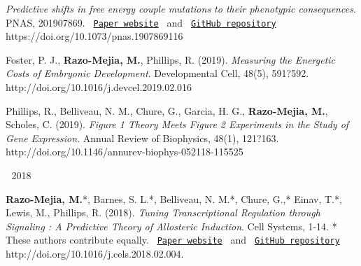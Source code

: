 \begin{cventries}
{\begin{cvitems}
{\begin{flushleft}
          \textit{Predictive shifts in free energy couple mutations to their
          phenotypic consequences}. PNAS, 201907869.
          \texttt{
          \href{https://www.rpgroup.caltech.edu/mwc_mutants/}{Paper website} 
          }
          and
          \texttt{
          \href{https://github.com/RPGroup-PBoC/mwc_mutants}{GitHub repository}
          }
          \linebreak
          https://doi.org/10.1073/pnas.1907869116
        \end{flushleft}
        }
        \item {
          \begin{flushleft}
            Foster, P. J., \textbf{Razo-Mejia, M.}, Phillips, R. (2019).
            \textit{Measuring the Energetic Costs of Embryonic Development}.
            Developmental Cell, 48(5), 591?592.\linebreak
            http://doi.org/10.1016/j.devcel.2019.02.016
          \end{flushleft}
        }
        \item {
          \begin{flushleft}
            Phillips, R., Belliveau, N. M., Chure, G., Garcia, H. G.,
            \textbf{Razo-Mejia, M.}, Scholes, C. (2019). \textit{Figure 1
            Theory Meets Figure 2 Experiments in the Study of Gene Expression}.
            Annual Review of Biophysics, 48(1), 121?163.\linebreak
            http://doi.org/10.1146/annurev-biophys-052118-115525
          \end{flushleft}
        }
      \end{cvitems}
    }

\cventry
    {$\;$}
    {2018}
    {$\;$}
    {$\;$}
    {
      \begin{cvitems}
        \item {
        \begin{flushleft}
          \textbf{Razo-Mejia, M.}*, Barnes, S. L.*, Belliveau, N. M.*, Chure,
          G.,* Einav, T.*, Lewis, M., Phillips, R. (2018). \textit{Tuning
          Transcriptional Regulation through Signaling : A Predictive Theory of
          Allosteric Induction}. Cell Systems, 1-14. * These authors contribute
          equally. 
          \texttt{
            \href{http://www.rpgroup.caltech.edu/mwc_induction/}{Paper website} 
            }
            and
            \texttt{
            \href{http://www.github.com/rpgroup-pboc/mwc_induction}{GitHub repository}
            }
          \linebreak
          http://doi.org/10.1016/j.cels.2018.02.004.
        \end{flushleft}
        }
      \end{cvitems}
    }


\end{cventries}
